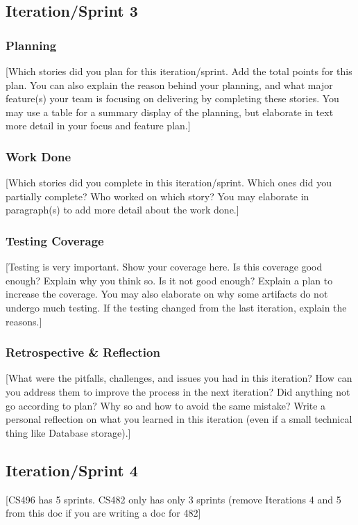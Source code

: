 \documentclass{article}
\begin{document}
\subsection{Iteration/Sprint 3}
\subsubsection{Planning}
[Which stories did you plan for this iteration/sprint. Add the total points for this plan. You can also explain the reason behind your planning, and what major feature(s) your team is focusing on delivering by completing these stories. You may use a table for a summary display of the planning, but elaborate in text more detail in your focus and feature plan.]

\subsubsection{Work Done}
[Which stories did you complete in this iteration/sprint. Which ones did you partially complete? Who worked on which story? You may elaborate in paragraph(s) to add more detail about the work done.]

\subsubsection{Testing Coverage}
[Testing is very important. Show your coverage here. Is this coverage good enough? Explain why you think so. Is it not good enough? Explain a plan to increase the coverage. You may also elaborate on why some artifacts do not undergo much testing. If the testing changed from the last iteration, explain the reasons.]

\subsubsection{Retrospective \& Reflection}
[What were the pitfalls, challenges, and issues you had in this iteration? How can you address them to improve the process in the next iteration? Did anything not go according to plan? Why so and how to avoid the same mistake? Write a personal reflection on what you learned in this iteration (even if a small technical thing like Database storage).]

\subsection{Iteration/Sprint 4}
[CS496 has 5 sprints. CS482 only has only 3 sprints (remove Iterations 4 and 5 from this doc if you are writing a doc for 482]
\end{document}
